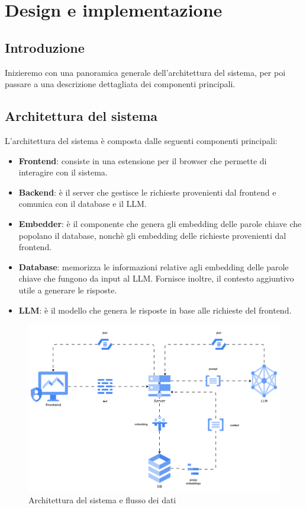 \chapter{Design e implementazione}
\label{ch:sistema}

\section{Introduzione}
Inizieremo con una panoramica generale dell'architettura
del sistema, per poi passare a una descrizione dettagliata
dei componenti principali.

\section{Architettura del sistema}
\label{sec:architettura}
L'architettura del sistema è composta dalle seguenti componenti principali:

\begin{itemize}
      \item \textbf{Frontend}: consiste in una estensione per il browser che
            permette di interagire con il sistema.
      \item \textbf{Backend}: è il server che gestisce le richieste
            provenienti dal frontend e comunica con il database e il LLM.
      \item \textbf{Embedder}: è il componente che genera gli embedding
            delle parole chiave che popolano il database, nonchè gli embedding
            delle richieste provenienti dal frontend.
      \item \textbf{Database}: memorizza le informazioni relative agli embedding
            delle parole chiave che fungono da input al LLM.
            Fornisce inoltre, il contesto aggiuntivo utile a generare
            le risposte.
      \item \textbf{LLM}: è il modello che genera le risposte in base
            alle richieste del frontend.
\end{itemize}

\begin{figure}
      \centering
      \includegraphics[width=1\textwidth]{res/architecture2.png}
      \caption{Architettura del sistema e flusso dei dati}
      \label{fig:architettura}
\end{figure}

